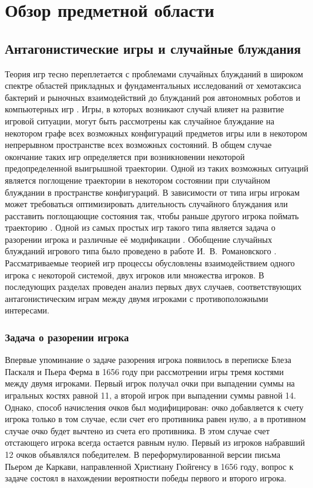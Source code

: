 \chapter{Обзор предметной области}\label{ch:ch1}

\section{Антагонистические игры и случайные блуждания}\label{sec:ch1/sec1}

Теория игр тесно переплетается с проблемами случайных блужданий в широком спектре областей прикладных и фундаментальных исследований 
от хемотаксиса бактерий и рыночных взаимодействий до блужданий роя автономных роботов и компьютерных игр \cite{}. 
Игры, в которых возникают случай влияет на развитие игровой ситуации, могут быть рассмотрены как случайное блуждание
на некотором графе всех возможных конфигураций предметов игры или в некотором непрерывном пространстве всех возможных состояний.
В общем случае окончание таких игр определяется при возникновении некоторой предопределенной выигрышной траектории.
Одной из таких возможных ситуаций является поглощение траектории в некотором состоянии при случайном блуждании в пространстве конфигураций.
В зависимости от типа игры игрокам может требоваться оптимизировать длительность случайного блуждания или расставить поглощающие состояния 
так, чтобы раньше другого игрока поймать траекторию \cite{}. Одной из самых простых игр такого типа является задача о разорении игрока \cite{}
и различные её модификации \cite{}. Обобщение случайных блужданий игрового типа было проведено в работе И.~В.~Романовского \cite{romanovskiy_1961}.
Рассматриваемые теорией игр процессы обусловлены взаимодействием одного игрока с некоторой системой, двух игроков или множества игроков.
В последующих разделах проведен анализ первых двух случаев, соответствующих антагонистическим играм между двумя игроками с противоположными интересами.

\subsection{Задача о разорении игрока}\label{subsec:ch1/sec1/sub1}

Впервые упоминание о задаче разорения игрока появилось в переписке Блеза Паскаля и Пьера Ферма в 1656 году при рассмотрении игры тремя костями между двумя игроками.
Первый игрок получал очки при выпадении суммы на игральных костях равной 11, а второй игрок при выпадении суммы равной 14. Однако, способ начисления очков 
был модифицирован: очко добавляется к счету игрока только в том случае, если счет его противника равен нулю, а в противном случае очко будет вычтено из счета его противника.
В этом случае счет отстающего игрока всегда остается равным нулю. Первый из игроков набравший 12 очков объявлялся победителем. В переформулированной версии
письма Пьером де Каркави, направленной Христиану Гюйгенсу в 1656 году, вопрос к задаче состоял в нахождении вероятности победы первого и второго игрока. 

